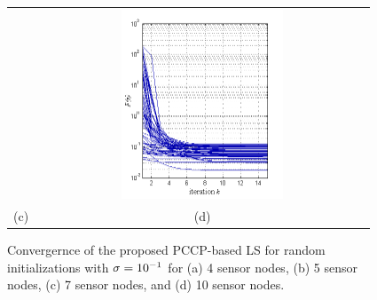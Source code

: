 \begin{figure}[t]
\begin{tabular}{cc}
 &
  \includegraphics[width=0.5\textwidth,height =0.45\textheight]{figures/ccp/convergence_m10_2_.png} 
  \\   (c) & (d)  
\end{tabular}
\caption{Convergernce of the proposed PCCP-based LS for random initializations with $\protect\sigma = 10\protect^{-1}$ for (a) 4 sensor nodes, (b) 5 sensor nodes, (c) 7 sensor nodes, and (d) 10 sensor nodes.} 
\label{fig:convergence}
\end{figure}